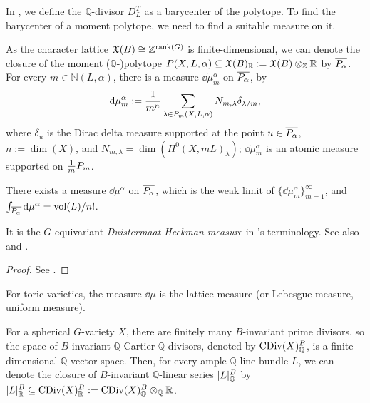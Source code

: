 \newcommand{\Rls}[1]{\ls{#1}_\mathbb{R}}

In , we define the $\mathbb{Q}$-divisor $D^T_L$ as a barycenter of the polytope. To find the barycenter of a moment polytope, we need to find a suitable measure on it.

As the character lattice $\mathfrak{X}(B) \cong \mathbb{Z}^{\mathrm{rank}(G)}$ is finite-dimensional, we can denote the closure of the moment ($\mathbb{Q}$-)polytope $P(X, L, \alpha) \subseteq \mathfrak{X}(B)_\mathbb{R} := \mathfrak{X}(B) \otimes_\mathbb{Z} \mathbb{R}$ by $\overline{P_\alpha}$. For every $m \in \mathbb{N}(L, \alpha)$, there is a measure $\dd \mu^\alpha_m$ on $\overline{P_\alpha}$, by
\begin{equation}
	\dd \mu^\alpha_m := {1 \over m^n} \sum_{\lambda \in P_m(X, L, \alpha)} N_{m, \lambda} \delta_{\lambda / m},
\end{equation}
where $\delta_u$ is the Dirac delta measure supported at the point $u \in \overline{P_\alpha}$, $n := \dim(X)$, and $N_{m, \lambda} = \dim(H^0(X, m L)_\lambda)$; $\dd \mu^\alpha_m$ is an atomic measure supported on ${1 \over m} P_m$.

\begin{lemdefn}
	There exists a measure $\dd \mu^\alpha$ on $\overline{P_\alpha}$, which is the weak limit of $\{\dd \mu^\alpha_m\}_{m = 1}^\infty$, and $\int_{\overline{P_\alpha}} \mathrm{d} \mu^\alpha = \mathrm{vol}(L) / n!$.
\end{lemdefn}
\begin{remark*}
	It is the $G$-equivariant \emph{Duistermaat-Heckman measure} in \cite[Definition-Theorem 2.31]{Xu_Book}'s terminology. See also \cite{Delcroix_Kst_Fano_spher} and \cite[\S4.3]{Yin_valu_lin_sph}.
\end{remark*}
\begin{proof}
	See \cite[\S4.1]{Brion_grp_Pic_num_char_sph}.
\end{proof}

\begin{example}
	For toric varieties, the measure $\dd \mu$ is the lattice measure (or Lebesgue measure, uniform measure).
\end{example}

For a spherical $G$-variety $X$, there are finitely many $B$-invariant prime divisors, so the space of $B$-invariant $\mathbb{Q}$-Cartier $\mathbb{Q}$-divisors, denoted by $\mathrm{CDiv}(X)^B_\mathbb{Q}$, is a finite-dimensional $\mathbb{Q}$-vector space. Then, for every ample $\mathbb{Q}$-line bundle $L$, we can denote the closure of $B$-invariant $\mathbb{Q}$-linear series $\mathopen{}\left|L\right|\mathclose{}_\mathbb{Q}^B$ by $\Rls{L}^B \subseteq \CDiv(X)^B_\mathbb{R} := \CDiv(X)^B_\mathbb{Q} \otimes_\mathbb{Q} \mathbb{R}$.

